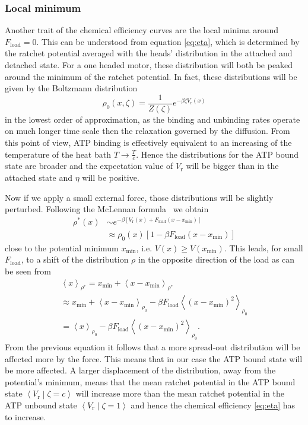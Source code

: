 \documentclass[aps,pre,twocolumn,showpacs,showkeys,superscriptaddress,floatfix]{revtex4-1}
\begin{document}
\subsubsection{Local minimum}
Another trait of the chemical efficiency curves are the local minima around $F_\text{load}=0$. 
This can be understood from equation \eqref{eq:eta}, which is determined by the ratchet potential averaged with the heads' distribution in the attached and detached state. 
For a one headed motor, these distribution will both be peaked around the minimum of the ratchet potential. 
In fact, these distributions will be given by the Boltzmann distribution
\begin{equation}
\rho_0(x,\zeta) = \frac{1}{Z(\zeta)} e^{-\beta \zeta V_\text{r}(x)}
\end{equation} 
in the lowest order of approximation, as the binding and unbinding rates operate on much longer time scale then the relaxation governed by the diffusion. 
From this point of view, ATP binding is effectively equivalent to an increasing of the temperature of the heat bath $T\rightarrow\frac{T}{c}$. 
Hence the distributions for the ATP bound state are broader and the expectation value of $V_\text{r}$ will be bigger than in the attached state and $\eta$ will be positive. 

Now if we apply a small external force, those distributions will be slightly perturbed. 
Following the McLennan formula~\cite{Maes2010} we obtain  
\begin{align*}
\rho^*(x) 
&\sim e^{-\beta \left[V_\text{r}(x) + F_\text{load} \left( x - x_\text{min} \right) \right]} \\
&\approx \rho_0(x) \left[1 - \beta F_\text{load} \left( x - x_\text{min} \right) \right]
\end{align*}
close to the potential minimum $x_\text{min}$, i.e. $V(x) \ge V(x_\text{min})$. 
This leads, for small $F_\text{load}$, to a shift of the distribution $\rho$ in the opposite direction of the load
as can be seen from 
\begin{multline}
\left\langle x \right\rangle_{\rho^*} 
= x_\text{min} + \left\langle x - x_\text{min} \right\rangle_{\rho^*}
\\
\approx x_\text{min} + \left\langle x - x_\text{min} \right\rangle_{\rho_0} 
- \beta F_\text{load} \left\langle \left( x - x_\text{min} \right)^2 \right\rangle_{\rho_0} 
\\
= \left\langle x \right\rangle_{\rho_0}
- \beta F_\text{load} \left\langle \left( x - x_\text{min} \right)^2 \right\rangle_{\rho_0} .
\label{eq:mean_position_shift}
\end{multline}
From the previous equation it follows that a more spread-out distribution will be affected more by the force.
This means that in our case the ATP bound state will be more affected.
A larger displacement of the distribution, away from the potential's minimum, 
means that the mean ratchet potential in the ATP bound state $\left\langle V_\text{r} \middle| \zeta = c \right\rangle$ will increase more than the mean ratchet potential in the ATP unbound state $\left\langle V_\text{r} \middle| \zeta = 1 \right\rangle$ and hence the chemical efficiency \eqref{eq:eta} has to increase. 
\end{document}

